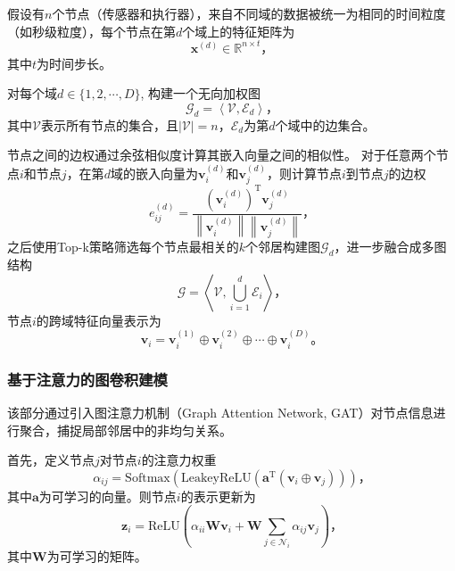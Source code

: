假设有$n$个节点（传感器和执行器），来自不同域的数据被统一为相同的时间粒度（如秒级粒度），每个节点在第$d$个域上的特征矩阵为
\begin{equation*}
    \bm{x}^{(d)}\in\mathbb{R}^{n\times t} \text{，}
\end{equation*}
其中$t$为时间步长。

对每个域$d\in\{1,2,\cdots,D\}$, 构建一个无向加权图
\begin{equation*}
    \mathcal{G}_d=\left<\mathcal{V},\mathcal{E}_d\right> \text{，}
\end{equation*}
其中$\mathcal{V}$表示所有节点的集合，且$|\mathcal{V}|=n$，$\mathcal{E}_d$为第$d$个域中的边集合。

节点之间的边权通过余弦相似度计算其嵌入向量之间的相似性。
对于任意两个节点$i$和节点$j$，在第$d$域的嵌入向量为$\bm{v}_i^{(d)}$和$\bm{v}_j^{(d)}$，则计算节点$i$到节点$j$的边权
\begin{equation*}
    e_{ij}^{(d)}=\frac{\left(\bm{v}_i^{(d)}\right)^\mathrm{T}\bm{v}_j^{(d)}}{\left\|\bm{v}_i^{(d)}\right\|\left\|\bm{v}_j^{(d)}\right\|} \text{，}
\end{equation*}
之后使用Top-k策略筛选每个节点最相关的$k$个邻居构建图$\mathcal{G}_d$，进一步融合成多图结构
\begin{equation*}
    \mathcal{G}=\left<\mathcal{V}, \textstyle\bigcup_{i=1}^d\mathcal{E}_i\right> \text{，}
\end{equation*}
节点$i$的跨域特征向量表示为
\begin{equation*}
    \bm{v}_i=\bm{v}_i^{(1)}\oplus\bm{v}_i^{(2)}\oplus\cdots\oplus\bm{v}_i^{(D)} \text{。}
\end{equation*}

\subsubsection{基于注意力的图卷积建模}

该部分通过引入图注意力机制（Graph Attention Network, GAT）\cite{deng2021graph}对节点信息进行聚合，捕捉局部邻居中的非均匀关系。

首先，定义节点$j$对节点$i$的注意力权重
\begin{equation*}
    \alpha_{ij}=\mathrm{Softmax}\left(\mathrm{LeakeyReLU}\left(\bm{a}^\mathrm{T}(\bm{v}_i\oplus\bm{v}_j)\right)\right) \text{，}
\end{equation*}
其中$\bm{a}$为可学习的向量。则节点$i$的表示更新为
\begin{equation*}
    \bm{z}_i=\mathrm{ReLU}\left(\alpha_{ii}\bm{W}\bm{v}_i+\bm{W}\sum_{j\in\mathcal{N}_i}\alpha_{ij}\bm{v}_j\right) \text{，}
\end{equation*}
其中$\bm{W}$为可学习的矩阵。

